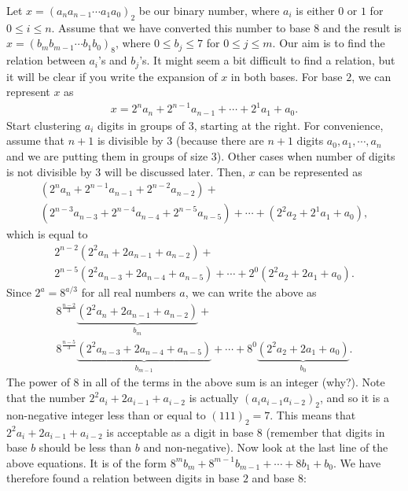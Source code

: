 \documentclass{subfile}
\begin{document}
	Let $x = (a_{n}a_{n-1}\cdots a_1a_0)_2$ be our binary number, where $a_i$ is either $0$ or $1$ for $0\leq i \leq n$. Assume that we have converted this number to base $8$ and the result is $x = (b_{m}b_{m-1}\cdots b_1b_0)_8$, where $0\leq b_j \leq 7$ for $0 \leq j \leq m$. Our aim is to find the relation between $a_i$'s and $b_j$'s. It might seem a bit difficult to find a relation, but it will be clear if you write the expansion of $x$ in both bases. For base $2$, we can represent $x$ as
	\begin{align*}
		x =  2^{n} a_{n} + 2^{n-1} a_{n-1} + \cdots + 2^1a_1 + a_0.
	\end{align*}
	Start clustering $a_i$ digits in groups of $3$, starting at the right. For convenience, assume that $n+1$ is divisible by $3$ (because there are $n+1$ digits $a_0, a_1, \cdots, a_n$ and we are putting them in groups of size $3$). Other cases when number of digits is not divisible by $3$ will be discussed later. Then, $x$ can be represented as
	\begin{multline*}
		 \left(2^{n} a_{n} + 2^{n-1} a_{n-1} + 2^{n-2} a_{n-2} \right) + \\ \left(2^{n-3}  a_{n-3} + 2^{n-4} a_{n-4} + 2^{n-5} a_{n-5} \right) +\cdots + \left( 2^2a_2 + 2^1a_1 + a_0 \right),
	\end{multline*}
	which is equal to
	\begin{multline*}
		2^{n-2}\left(2^2 a_{n} + 2 a_{n-1} + a_{n-2} \right) + \\ 2^{n-5} \left(2^2 a_{n-3}  +  2 a_{n-4} + a_{n-5} \right)+  \cdots + 2^0\left( 2^2a_2 + 2a_1 + a_0 \right).
	\end{multline*}
	Since $2^{a}=8^{a/3}$ for all real numbers $a$, we can write the above as
	\begin{multline*}
   		8^{\frac{n-2}{3}} \underbrace{\left(2^2 a_{n} + 2 a_{n-1} + a_{n-2} \right)}_{b_m} + \\ 8^{\frac{n-5}{3}}  \underbrace{\left(2^2 a_{n-3} + 2 a_{n-4} + a_{n-5} \right)}_{b_{m-1}} + \cdots + 8^0 \underbrace{\left( 2^2a_2 + 2a_1 + a_0 \right)}_{b_0}.
	\end{multline*}
	The power of $8$ in all of the terms in the above sum is an integer (why?). Note that the number $2^2 a_i + 2 a_{i-1} + a_{i-2}$ is actually $(a_{i}a_{i-1}a_{i-2})_2$, and so it is a non-negative integer less than or equal to $(111)_2 = 7$. This means that $2^2 a_i + 2 a_{i-1} + a_{i-2}$ is acceptable as a digit in base $8$ (remember that digits in base $b$ should be less than $b$ and non-negative). Now look at the last line of the above equations. It is of the form $8^m b_m + 8^{m-1}b_{m-1} + \cdots + 8b_1+b_0$. We have therefore found a relation between digits in base $2$ and base $8$:
\end{document}
